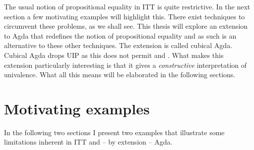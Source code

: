 The usual notion of propositional equality in ITT is quite
restrictive. In the next section a few motivating examples will
highlight this. There exist techniques to circumvent these problems,
as we shall see. This thesis will explore an extension to Agda that
redefines the notion of propositional equality and as such is an
alternative to these other techniques. The extension is called cubical
Agda. Cubical Agda drops UIP as this does not permit
 and
. What makes this extension particularly
interesting is that it gives a \emph{constructive} interpretation of
univalence. What all this means will be elaborated in the following
sections.
%
\section{Motivating examples}
%
In the following two sections I present two examples that illustrate
some limitations inherent in ITT and -- by extension -- Agda.
%
